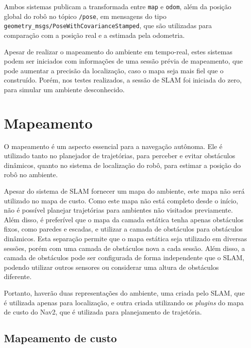 \documentclass[repeatfields,xlists,xpacks,oneside,yearsonly]{ufrgscca}
\begin{document}
Ambos sistemas publicam a transformada entre \texttt{map} e
\texttt{odom}, além da posição global do robô no tópico
\texttt{/pose}, em mensagens do tipo
\texttt{geometry\_msgs/PoseWithCovarianceStamped}, que são utilizadas
para comparação com a posição real e a estimada pela odometria.

Apesar de realizar o mapeamento do ambiente em tempo-real, estes
sistemas podem ser iniciados com informações de uma sessão prévia de
mapeamento, que pode aumentar a precisão da localização, caso o mapa
seja mais fiel que o construído. Porém, nos testes realizados, a
sessão de SLAM foi iniciada do zero, para simular um ambiente
desconhecido.

\section{Mapeamento}

O mapeamento é um aspecto essencial para a navegação autônoma. Ele é
utilizado tanto no planejador de trajetórias, para perceber e evitar
obstáculos dinâmicos, quanto no sistema de localização do robô, para
estimar a posição do robô no ambiente.

Apesar do sistema de SLAM fornecer um mapa do ambiente, este mapa não
será utilizado no mapa de custo. Como este mapa não está completo
desde o início, não é possível planejar trajetórias para ambientes
não visitados previamente. Além disso, é preferível que o mapa da
camada estática tenha apenas obstáculos fixos, como paredes e
escadas, e utilizar a camada de obstáculos para obstáculos dinâmicos.
Esta separação permite que o mapa estática seja utilizado em diversas
sessões, porém com uma camada de obstáculos nova a cada sessão. Além
disso, a camada de obstáculos pode ser configurada de forma
independente que o SLAM, podendo utilizar outros sensores ou
considerar uma altura de obstáculos diferente.

Portanto, haverão duas representações do ambiente, uma criada pelo
SLAM, que é utilizada apenas para localização, e outra criada
utilizando os \textit{plugins} do mapa de custo do Nav2, que é
utilizada para planejamento de trajetória.

\subsection{Mapeamento de custo}
\end{document}

